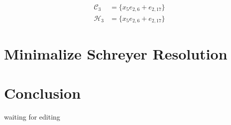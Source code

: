 \documentclass{article}
\theoremstyle{definition}
\theoremstyle{remark}
\theoremstyle{example}
\begin{document}
\begin{equation}
    \begin{aligned}
        \mathcal{C}_3 &= \{x_5e_{2,6}+e_{2,17}\}\\
        \mathcal{H}_3 &= \{x_5e_{2,6}+e_{2,17}\}
    \end{aligned}
\end{equation}

\section{Minimalize Schreyer Resolution}

\section{Conclusion}

\paragraph{  }

\textcolor{BrickRed}{waiting for editing}

\newpage
\printbibliography
\end{document}

